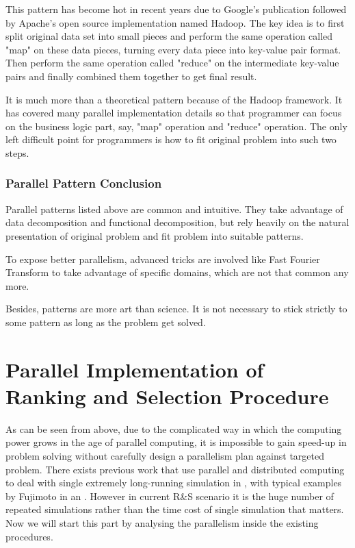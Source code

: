 \documentclass[12pt,a4paper]{report}
\begin{document}
This pattern has become hot in recent years due to Google's publication \cite{google-map-reduce} followed by Apache's open source implementation named Hadoop. The key idea is to first split original data set into small pieces and perform the same operation called "map" on these data pieces, turning every data piece into key-value pair format. Then perform the same operation called "reduce" on the intermediate key-value pairs and finally combined them together to get final result.

It is much more than a theoretical pattern because of the Hadoop framework. It has covered many parallel implementation details so that programmer can focus on the business logic part, say, "map" operation and "reduce" operation. The only left difficult point for programmers is how to fit original problem into such two steps.

\subsection{Parallel Pattern Conclusion}

Parallel patterns listed above are common and intuitive. They take advantage of data decomposition and functional decomposition, but rely heavily on the natural presentation of original problem and fit problem into suitable patterns.

To expose better parallelism, advanced tricks are involved like Fast Fourier Transform to take advantage of specific domains, which are not that common any more.

Besides, patterns are more art than science. It is not necessary to stick strictly to some pattern as long as the problem get solved.

\chapter{Parallel Implementation of Ranking and Selection Procedure}

As can be seen from above, due to the complicated way in which the computing power grows in the age of parallel computing, it is impossible to gain speed-up in problem solving without carefully design a parallelism plan against targeted problem. There exists previous work that use parallel and distributed computing to deal with single extremely long-running simulation in \cite{potwsc05ras}, with typical examples by Fujimoto in \cite{cotacm90fuji} an \cite{scsmasm10fuji}. However in current R\&S scenario it is the huge number of repeated simulations rather than the time cost of single simulation that matters. Now we will start this part by analysing the parallelism inside the existing procedures.
\end{document}
